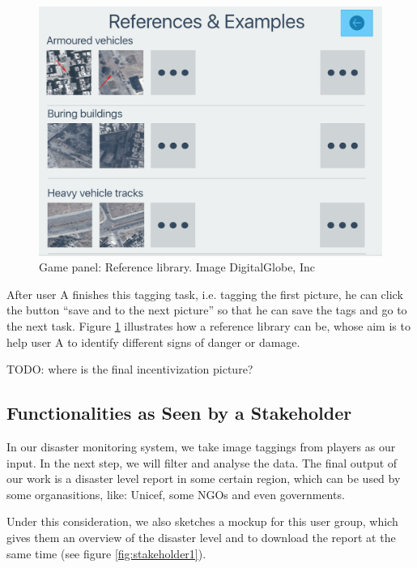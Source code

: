 \noindent\begin{minipage}{.45\textwidth}
\begin{figure}[H]
\centering
\includegraphics[width=\textwidth]{figures/function-player-3}
\caption{Game panel: Reference library. Image \textcopyright DigitalGlobe, Inc}
\label{fig:player3}
\end{figure}
\end{minipage}\hfill

After user A finishes this tagging task,
i.e.
tagging the first picture,
he can click the button ``save and to the next picture'' so that he can save the tags and go to the next task.
Figure \ref{fig:player3} illustrates how a reference library can be,
whose aim is to help user A to identify different signs of danger or damage.

TODO: where is the final incentivization picture?

\subsection{Functionalities as Seen by a Stakeholder}
In our disaster monitoring system, 
we take image taggings from players as our input. 
In the next step, 
we will filter and analyse the data.
The final output of our work is a disaster level report in some certain region,
which can be used by some organasitions,
like: Unicef, some NGOs and even governments.

Under this consideration, 
we also sketches a mockup for this user group,
which gives them an overview of the disaster level and 
to download the report at the same time (see figure \ref{fig:stakeholder1}).


